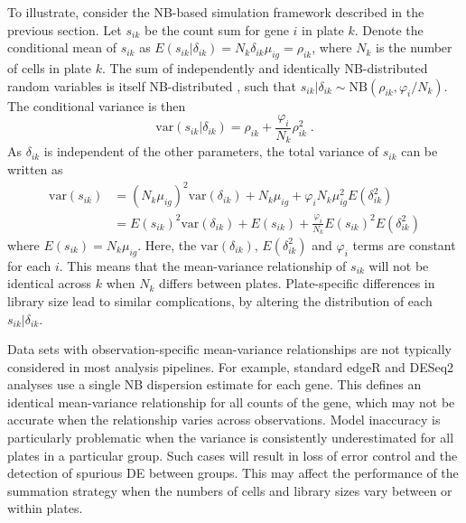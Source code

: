 \documentclass[oupdraft]{bio}
\begin{document}
To illustrate, consider the NB-based simulation framework described in the previous section.
Let $s_{ik}$ be the count sum for gene $i$ in plate $k$.
Denote the conditional mean of $s_{ik}$ as $E(s_{ik}|\delta_{ik})=N_k \delta_{ik}\mu_{ig} = \rho_{ik}$, where $N_k$ is the number of cells in plate $k$.
The sum of independently and identically NB-distributed random variables is itself NB-distributed \citep{robinson2008small}, 
    such that $s_{ik} |\delta_{ik} \sim \mbox{NB}(\rho_{ik}, \varphi_{i}/N_k)$.
The conditional variance is then
\[
    \mbox{var}(s_{ik} |\delta_{ik}) = \rho_{ik} + \frac{\varphi_{i}}{N_k}\rho_{ik}^2 \;.
\]
As $\delta_{ik}$ is independent of the other parameters, the total variance of $s_{ik}$ can be written as
\begin{align*}
    \mbox{var}(s_{ik}) &= (N_k\mu_{ig})^2\mbox{var}(\delta_{ik}) + N_k\mu_{ig} + \varphi_{i} N_k\mu_{ig}^2 E(\delta_{ik}^2) \nonumber \\ 
                       &= E(s_{ik})^2 \mbox{var}(\delta_{ik}) + E(s_{ik}) + \frac{\varphi_{i}}{N_k} E(s_{ik})^2 E(\delta_{ik}^2) 
\end{align*}
where $E(s_{ik})=N_k\mu_{ig}$. 
Here, the $\mbox{var}(\delta_{ik})$, $E(\delta_{ik}^2)$ and $\varphi_{i}$ terms are constant for each $i$.
This means that the mean-variance relationship of $s_{ik}$ will not be identical across $k$ when $N_k$ differs between plates.
Plate-specific differences in library size lead to similar complications, by altering the distribution of each $s_{ik} |\delta_{ik}$.

Data sets with observation-specific mean-variance relationships are not typically considered in most analysis pipelines.
For example, standard edgeR and DESeq2 analyses use a single NB dispersion estimate for each gene.
This defines an identical mean-variance relationship for all counts of the gene, which may not be accurate when the relationship varies across observations.
Model inaccuracy is particularly problematic when the variance is consistently underestimated for all plates in a particular group.
Such cases will result in loss of error control and the detection of spurious DE between groups.
This may affect the performance of the summation strategy when the numbers of cells and library sizes vary between or within plates.
\end{document}
